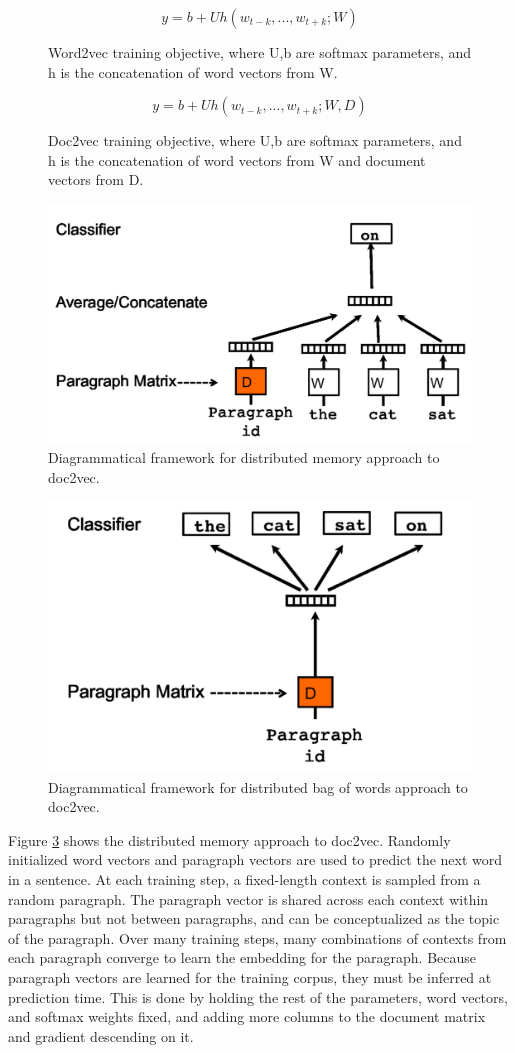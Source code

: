 \begin{figure}[h!]
    \centering
    $$y=b+Uh(w_{t-k}, ..., w_{t+k};W)$$
    \caption{Word2vec training objective, where U,b are softmax parameters, and h is the concatenation of word vectors from W.}
    \label{fig:word2vec-obj}
\end{figure}

\begin{figure}[h!]
    \centering
    $$y=b+Uh(w_{t-k}, ..., w_{t+k};W,D)$$
    \caption{Doc2vec training objective, where U,b are softmax parameters, and h is the concatenation of word vectors from W and document vectors from D.}
    \label{fig:doc2vec-obj}
\end{figure}

\begin{figure}[h!]
\centering
  \includegraphics[width=.5\linewidth]{files/doc2vec-2.png}
  \caption{Diagrammatical framework for distributed memory approach to doc2vec.}
  \label{fig:doc2vec2}
\end{figure}

\begin{figure}[h!]
\centering
  \includegraphics[width=.5\linewidth]{files/doc2vec-3.png}
  \caption{Diagrammatical framework for distributed bag of words approach to doc2vec.}
  \label{fig:doc2vec3}
\end{figure}

Figure \ref{fig:doc2vec2} shows the distributed memory approach to doc2vec. Randomly initialized word vectors and paragraph vectors are used to predict the next word in a sentence. At each training step, a fixed-length context is sampled from a random paragraph. The paragraph vector is shared across each context within paragraphs but not between paragraphs, and can be conceptualized as the topic of the paragraph. Over many training steps, many combinations of contexts from each paragraph converge to learn the embedding for the paragraph. Because paragraph vectors are learned for the training corpus, they must be inferred at prediction time. This is done by holding the rest of the parameters, word vectors, and softmax weights fixed, and adding more columns to the document matrix and gradient descending on it.

